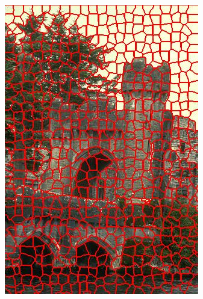 \begin{figure}
{		\includegraphics[scale=\scalefivebsdtest]{pictures/bsd-test-5-tp}
	}
	\subfigure{
}
\end{figure}
